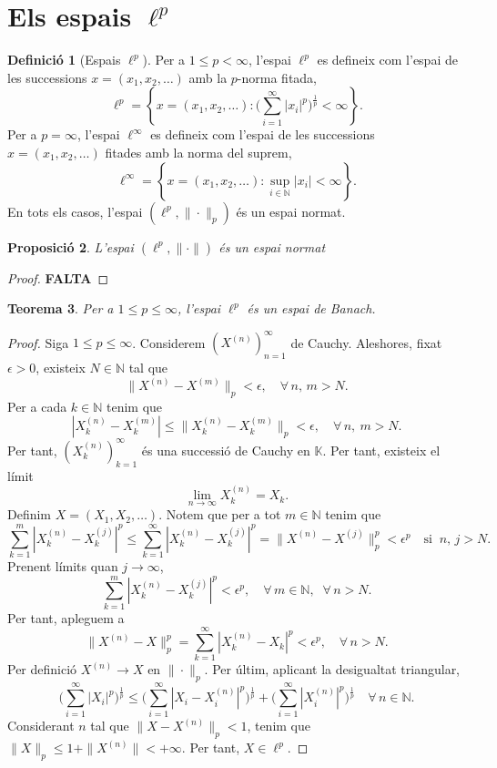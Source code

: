\documentclass[12pt]{book}
\newtheorem{teorema}{Teorema}[chapter]
\newtheorem{prop}[teorema]{Proposició}
\theoremstyle{definition}
\newtheorem{defi}[teorema]{Definició}
\theoremstyle{nota}
\theoremstyle{exemple}
\begin{document}
\section{Els espais \texorpdfstring{$\ell^p$}{lp}}

\begin{defi}[Espais $\ell^p$]
  Per a $1 \leq p < \infty$, l'espai $\ell^p$ es defineix com l'espai
  de les successions $x = (x_1, x_2, \dotsc)$ amb la $p$-norma fitada,
  \[
    \ell^p = \left\{ x = (x_1, x_2, \dotsc) : \Big(
      \sum_{i=1}^{\infty} |x_i|^p \Big)^{\frac{1}{p}} < \infty
    \right\}.
  \]
  Per a $p = \infty$, l'espai $\ell^\infty$ es defineix com l'espai de
  les successions $x = (x_1, x_2, \dotsc)$ fitades amb la norma del
  suprem,
  \[
    \ell^\infty = \left\{ x = (x_1, x_2, \dotsc) : \sup_{i \in
        \mathbb{N}} |x_i| < \infty \right\}.
  \]
  En tots els casos, l'espai $(\ell^p, \|\cdot\|_p)$ és un espai
  normat.
\end{defi}

\begin{prop}
  L'espai $(\ell^p, \|\cdot\|)$ és un espai normat
\end{prop}

\begin{proof}
  \color{red}\sffamily\bfseries
  FALTA 
\end{proof}

\begin{teorema}
  Per a $1 \leq p \leq \infty$, l'espai $\ell^p$ és un espai de
  Banach.
\end{teorema}

\begin{proof}
  Siga $1 \leq p \leq \infty$. Considerem $(X^{(n)})_{n=1}^\infty$ de
  Cauchy. Aleshores, fixat $\epsilon > 0$, existeix $N \in \mathbb{N}$
  tal que
  \[
    \|X^{(n)}-X^{(m)}\|_p < \epsilon, \quad \forall\,n,\,m > N.
  \]
  Per a cada $k \in \mathbb{N}$ tenim que
  \[
    |X_k^{(n)}-X_k^{(m)}| \leq \|X_k^{(n)}-X_k^{(m)}\|_p < \epsilon,
    \quad \forall\,n,\ m > N.
  \]
  Per tant, $(X_k^{(n)})_{k=1}^\infty$ és una successió de Cauchy en
  $\mathbb{K}$. Per tant, existeix el límit
  \[
    \lim_{n\to\infty} X_k^{(n)} = X_k.
  \]
  Definim $X = (X_1, X_2, \dotsc)$. Notem que per a tot
  $m \in \mathbb{N}$ tenim que
  \[
    \sum_{k=1}^m |X_k^{(n)}-X_k^{(j)}|^p \leq
    \sum_{k=1}^{\infty}|X_k^{(n)} - X_k^{(j)}|^p = \|X^{(n)} -
    X^{(j)}\|_p^p < \epsilon^p \quad \text{si} \;\; n,\,j > N.
  \]
  Prenent límits quan $j \to \infty$,
  \[
    \sum_{k=1}^{m}|X_k^{(n)} - X_k^{(j)}|^p < \epsilon^p, \quad
    \forall\,m \in \mathbb{N},\;\; \forall\,n > N.
  \]
  Per tant, apleguem a
  \[
    \|X^{(n)}-X\|_p^p = \sum_{k=1}^{\infty} |X_k^{(n)}-X_k|^p <
    \epsilon^p, \quad \forall \, n > N.
  \]
  Per definició $X^{(n)} \to X$ en $\|\cdot\|_p$. Per últim, aplicant
  la desigualtat triangular,
  \[
    \Big( \sum_{i=1}^\infty |X_i|^p \Big)^{\frac{1}{p}} \leq
    \Big( \sum_{i=1}^\infty |X_i - X_i^{(n)}|^p \Big)^{\frac{1}{p}} +
    \Big( \sum_{i=1}^\infty |X_i^{(n)}|^p \Big)^{\frac{1}{p}}
    \quad \forall \, n \in \mathbb{N}.
  \]
  Considerant $n$ tal que $\|X-X^{(n)}\|_p < 1$, tenim que
  $\|X\|_p \leq 1 + \|X^{(n)}\| < +\infty$. Per tant, $X \in \ell^p$.
\end{proof}
\end{document}
